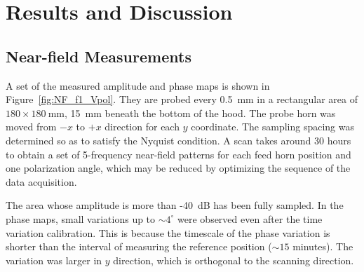 \documentclass[journal]{IEEEtran}
\newcommand{\red}[1]{\textcolor{red}{#1}}
\begin{document}
\section{Results and Discussion}
%
\subsection{Near-field Measurements}
%
A set of the measured amplitude and phase maps is shown in Figure~\ref{fig:NF_f1_Vpol}. They are probed every 0.5~mm in a rectangular area of $180 \times 180~\mathrm{mm}$, 15~mm beneath the bottom of the hood. The probe horn was moved from $-x$ to $+x$ direction for each $y$ coordinate. The sampling spacing was determined so as to satisfy the Nyquist condition. %
A scan takes around 30 hours to obtain a set of 5-frequency near-field patterns for each feed horn position and one polarization angle, which may be reduced by optimizing the sequence of the data acquisition.
%
\par
The area whose amplitude is more than -40~dB has been fully sampled. In the phase maps, small variations up to $\sim 4^\circ$ were observed even after the time variation calibration. This is because the timescale of the phase variation is shorter than the interval of measuring the reference position ($\sim 15$ minutes). 
The variation was larger in $y$ direction, which is orthogonal to the scanning direction.
\end{document}
